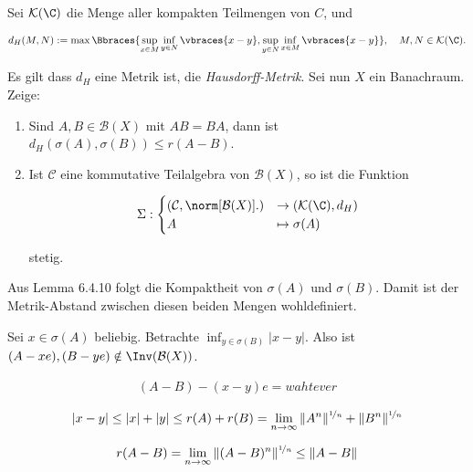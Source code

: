 \begin{exercise}[22/2$^\ast$]

Sei $\mathcal{K}(\C)$ die Menge aller kompakten Teilmengen von $C$, und

\begin{align*}
  d_H(M, N)
  :=
  \max \Bbraces
  {
    \sup_{x \in M} \inf_{y \in N} \vbraces{x - y},
    \sup_{y \in N} \inf_{x \in M} \vbraces{x - y}
  },
  \quad
  M, N \in \mathcal{K}(\C).
\end{align*}

Es gilt dass $d_H$ eine Metrik ist, die \textit{Hausdorff-Metrik}.
Sei nun $X$ ein Banachraum.
Zeige:

\begin{enumerate}[label = (\alph*)]

  \item
  Sind $A, B \in \mathcal{B}(X)$ mit $A B = B A$, dann ist $d_H(\sigma(A), \sigma(B)) \leq r(A - B)$.

  \item
  Ist $\mathcal{C}$ eine kommutative Teilalgebra von $\mathcal{B}(X)$, so ist die Funktion

  \begin{align*}
    \Sigma:
    \begin{cases}
      (\mathcal{C}, \norm[\mathcal{B}(X)]{.}) & \to (\mathcal{K}(\C), d_H) \\
      A & \mapsto \sigma(A)
    \end{cases}
  \end{align*}

  stetig.

\end{enumerate}

\end{exercise}

\begin{solution}
Aus Lemma 6.4.10 folgt die Kompaktheit von $\sigma(A)$ und $\sigma(B)$. Damit
ist der Metrik-Abstand zwischen diesen beiden Mengen wohldefiniert.

Sei $x \in \sigma(A)$ beliebig. Betrachte $\inf_{y \in \sigma(B)}|x-y|$.
Also ist $(A - xe),(B - ye) \notin \Inv(\mathcal{B}(X))$.

\begin{align*}
  (A - B) -(x -y)e = wahtever
\end{align*}

\begin{align*}
  |x - y| \leq |x| + |y| \leq r(A) + r(B) = \lim_{n \to \infty}\|A^n\|^{\nicefrac{1}{n}}
  + \|B^n\|^{\nicefrac{1}{n}}
\end{align*}

\begin{align*}
  r(A - B) = \lim_{n \to \infty} \|(A-B)^n\|^{\nicefrac{1}{n}} \leq \|A-B\|
\end{align*}
\end{solution}
